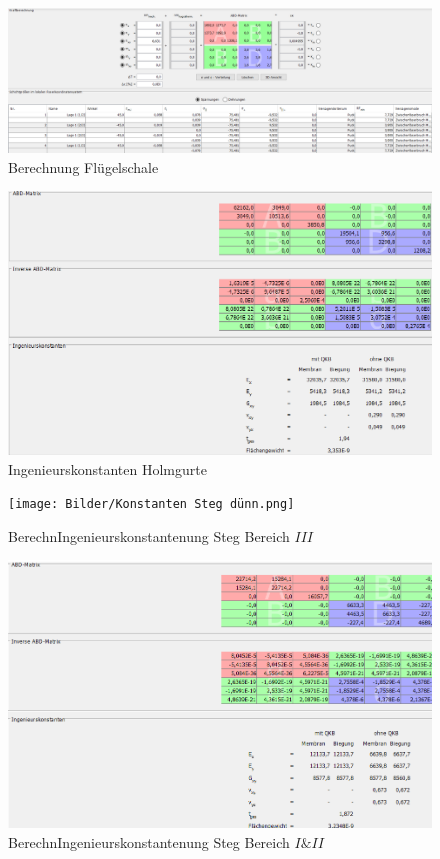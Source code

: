 \begin{figure}[h]
	\includegraphics[width=1.0\textwidth]{Bilder/Berechnung Haut.png}
	\caption{Berechnung Flügelschale}
	\label{fig:Berechnung Haut}
\end{figure}
\begin{figure}[h]
	\includegraphics[width=1.0\textwidth]{Bilder/Konstanten Holmgurte.png}
	\caption{Ingenieurskonstanten Holmgurte}
	\label{fig:Ingenieurskonstanten Holmgurte}
\end{figure}
\begin{figure}[h]
	\texttt{[image: Bilder/Konstanten Steg dünn.png]}
	\caption{BerechnIngenieurskonstantenung Steg Bereich $III$}
	\label{fig:Ingenieurskonstanten Steg dünn}
\end{figure}
\begin{figure}[h]
	\includegraphics[width=1.0\textwidth]{Bilder/Konstanten Steg dick.png}
	\caption{BerechnIngenieurskonstantenung Steg Bereich $I\&II$}
	\label{fig:Ingenieurskonstanten Steg dick}
\end{figure}
